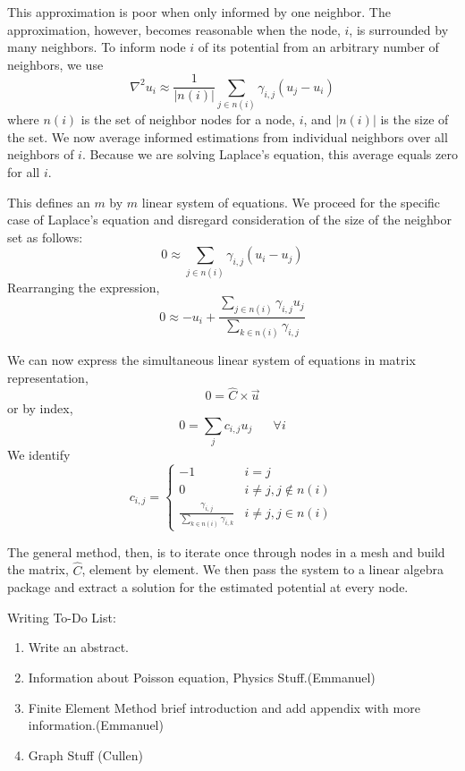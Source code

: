 This approximation is poor when only informed by one neighbor. The approximation, however, becomes reasonable when the node, $i$, is surrounded by many neighbors. To inform node $i$ of its potential from an arbitrary number of neighbors, we use
\begin{equation}
    \nabla^2 u_i \approx \frac{1}{|n(i)|} \sum_{j \in n(i)} \gamma_{i,j}(u_j - u_i)
\end{equation}
where $n(i)$ is the set of neighbor nodes for a node, $i$, and $|n(i)|$ is the size of the set. We now average informed estimations from individual neighbors over all neighbors of $i$. Because we are solving Laplace's equation, this average equals zero for all $i$.

This defines an $m$ by $m$ linear system of equations. We proceed for the specific case of Laplace's equation and disregard consideration of the size of the neighbor set as follows:
\begin{equation}
    0 \approx \sum_{j \in n(i)} \gamma_{i,j} (u_i - u_j)
\end{equation}
Rearranging the expression,
\begin{equation}
    0 \approx -u_i + \frac
    {\sum_{j \in n(i)} \gamma_{i,j} u_j }
    {\sum_{k \in n(i)} \gamma_{i,j}}
\end{equation}

We can now express the simultaneous linear system of equations in matrix representation,
\begin{equation}
    0 = \hat{C} \times \Vec{u}
\end{equation}
or by index,
\begin{equation}
    0 = \sum_j c_{i,j} u_j \;\;\;\;\;\; \forall i
\end{equation}
We identify
\begin{equation}
    c_{i,j} = \begin{cases}
        -1 & i = j \\
        0 & i \not= j, j \not\in n(i) \\
        \frac{\gamma_{i,j}}{\sum_{k \in n(i)} \gamma_{i,k}} & i \not= j, j \in n(i)
    \end{cases}
\end{equation}

The general method, then, is to iterate once through nodes in a mesh and build the matrix, $\hat{C}$, element by element. We then pass the system to a linear algebra package and extract a solution for the estimated potential at every node.

Writing To-Do List:
\begin{enumerate}
    \item Write an abstract.
    \item Information about Poisson equation, Physics Stuff.(Emmanuel)
    \item Finite Element Method brief introduction and add appendix with more information.(Emmanuel)
    \item Graph Stuff (Cullen)
\end{enumerate}
